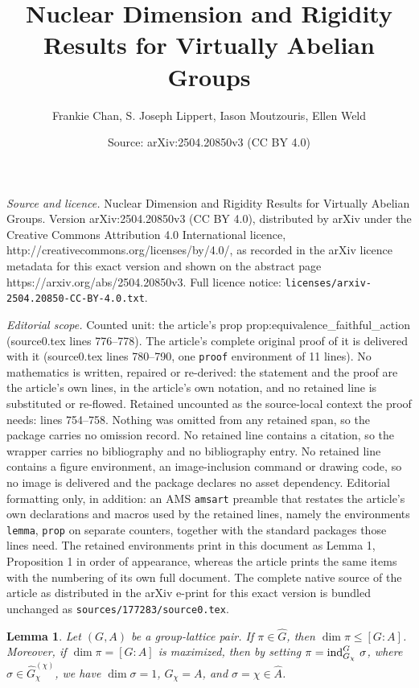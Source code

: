 \documentclass[10pt,a4paper]{amsart}
\title{Nuclear Dimension and Rigidity Results for Virtually Abelian Groups}
\author{Frankie Chan, S. Joseph Lippert, Iason Moutzouris, Ellen Weld}
\date{Source: arXiv:2504.20850v3 (CC BY 4.0)}
\newtheorem{lemma}{Lemma}
\newcommand{\te}[1]{\operatorname{#1}}
\newcommand{\wh}{\widehat}
\begin{document}
\maketitle

\noindent\emph{Source and licence.} Nuclear Dimension and Rigidity Results for Virtually Abelian Groups. Version arXiv:2504.20850v3 (CC BY 4.0), distributed by arXiv under the Creative Commons Attribution 4.0 International licence, http://creativecommons.org/licenses/by/4.0/, as recorded in the arXiv licence metadata for this exact version and shown on the abstract page https://arxiv.org/abs/2504.20850v3. Full licence notice: \texttt{licenses/arxiv-2504.20850-CC-BY-4.0.txt}.\par\smallskip

\noindent\textit{Editorial scope.} Counted unit: the article's prop prop:equivalence\_faithful\_action (source0.tex lines 776--778). The article's complete original proof of it is delivered with it (source0.tex lines 780--790, one \texttt{proof} environment of 11 lines). No mathematics is written, repaired or re-derived: the statement and the proof are the article's own lines, in the article's own notation, and no retained line is substituted or re-flowed.  Retained uncounted as the source-local context the proof needs: lines 754--758.  Nothing was omitted from any retained span, so the package carries no omission record.  No retained line contains a citation, so the wrapper carries no bibliography and no bibliography entry.  No retained line contains a figure environment, an image-inclusion command or drawing code, so no image is delivered and the package declares no asset dependency.  Editorial formatting only, in addition: an AMS \texttt{amsart} preamble that restates the article's own declarations and macros used by the retained lines, namely the environments \texttt{lemma}, \texttt{prop} on separate counters, together with the standard packages those lines need.  The retained environments print in this document as Lemma 1, Proposition 1 in order of appearance, whereas the article prints the same items with the numbering of its own full document.  The complete native source of the article as distributed in the arXiv e-print for this exact version is bundled unchanged as \texttt{sources/177283/source0.tex}.
\begin{lemma}\label{lemma:dim_argument}
Let $(G,A)$ be a group-lattice pair. If $\pi\in\wh{G}$, then $\dim \pi\leq [G:A]$. Moreover, if $\dim\pi=[G:A]$ is maximized, then by setting $\pi=\te{\normalfont{ind}}_{G_{\chi}}^G\,\sigma$, where $\sigma\in\wh{G}_{\chi}^{(\chi)}$, we have $\dim\sigma=1$, $G_\chi=A$, and $\sigma=\chi\in\wh{A}$.

\end{lemma}
\end{document}
